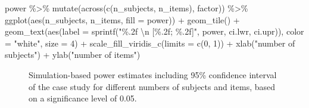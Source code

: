 \documentclass[
  man,
  floatsintext,
  longtable,
  a4paper,
  nolmodern,
  notxfonts,
  notimes,
  colorlinks=true,linkcolor=blue,citecolor=blue,urlcolor=blue]{apa7}
\newenvironment{Shaded}{\begin{snugshade}}{\end{snugshade}}
\newcommand{\AttributeTok}[1]{\textcolor[rgb]{0.40,0.45,0.13}{#1}}
\newcommand{\DecValTok}[1]{\textcolor[rgb]{0.68,0.00,0.00}{#1}}
\newcommand{\FunctionTok}[1]{\textcolor[rgb]{0.28,0.35,0.67}{#1}}
\newcommand{\NormalTok}[1]{\textcolor[rgb]{0.00,0.23,0.31}{#1}}
\newcommand{\SpecialCharTok}[1]{\textcolor[rgb]{0.37,0.37,0.37}{#1}}
\newcommand{\StringTok}[1]{\textcolor[rgb]{0.13,0.47,0.30}{#1}}
\begin{document}
\begin{Shaded}
\begin{Highlighting}[]
\NormalTok{power }\SpecialCharTok{\%\textgreater{}\%}
  \FunctionTok{mutate}\NormalTok{(}\FunctionTok{across}\NormalTok{(}\FunctionTok{c}\NormalTok{(n\_subjects, n\_items), factor)) }\SpecialCharTok{\%\textgreater{}\%}
  \FunctionTok{ggplot}\NormalTok{(}\FunctionTok{aes}\NormalTok{(n\_subjects, n\_items, }\AttributeTok{fill =}\NormalTok{ power)) }\SpecialCharTok{+}
  \FunctionTok{geom\_tile}\NormalTok{() }\SpecialCharTok{+}
  \FunctionTok{geom\_text}\NormalTok{(}\FunctionTok{aes}\NormalTok{(}\AttributeTok{label =} \FunctionTok{sprintf}\NormalTok{(}\StringTok{"\%.2f }\SpecialCharTok{\textbackslash{}n}\StringTok{ [\%.2f; \%.2f]"}\NormalTok{, }
\NormalTok{                                power, ci.lwr, ci.upr)), }
    \AttributeTok{color =} \StringTok{"white"}\NormalTok{, }\AttributeTok{size =} \DecValTok{4}\NormalTok{) }\SpecialCharTok{+}
  \FunctionTok{scale\_fill\_viridis\_c}\NormalTok{(}\AttributeTok{limits =} \FunctionTok{c}\NormalTok{(}\DecValTok{0}\NormalTok{, }\DecValTok{1}\NormalTok{)) }\SpecialCharTok{+}
  \FunctionTok{xlab}\NormalTok{(}\StringTok{"number of subjects"}\NormalTok{) }\SpecialCharTok{+} \FunctionTok{ylab}\NormalTok{(}\StringTok{"number of items"}\NormalTok{)}
\end{Highlighting}
\end{Shaded}

\begin{figure}[H]

\caption{\label{fig-finalpwr}Simulation-based power estimates including
95\% confidence interval of the case study for different numbers of
subjects and items, based on a significance level of 0.05.}


\end{figure}%
\end{document}

